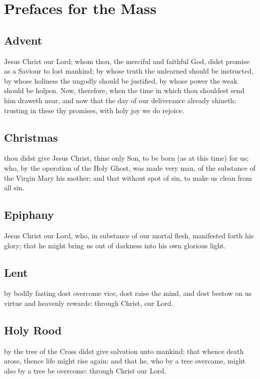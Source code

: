 \fancyhead[RE,LO]{}
\section{Prefaces for the Mass}\label{prefaces}

\begin{multicols}{2}
\subsection{Advent}%
 Jesus Christ our Lord; whom thou, the merciful and faithful God, didst promise as a Saviour to lost mankind; by whose truth the unlearned should be instructed, by whose holiness the ungodly should be justified, by whose power the weak should be holpen. Now, therefore, when the time in which thou shouldest send him draweth near, and now that the day of our deliverance already shineth; trusting in these thy promises, with holy joy we do rejoice.

\subsection{Christmas}%
\noindent
{} thou didst give Jesus Christ, thine only Son, to be born (as at this time) for us; who, by the operation of the Holy Ghost, was made very man, of the substance of the Virgin Mary his mother; and that without spot of sin, to make us clean from all sin.

\subsection{Epiphany}%
\noindent
{} Jesus Christ our Lord, who, in substance of our mortal flesh, manifested forth his glory; that he might bring us out of darkness into his own glorious light.

\subsection{Lent}%
\noindent
{} by bodily fasting dost overcome vice, dost raise the mind, and dost bestow on us virtue and heavenly rewards: through Christ, our Lord.

\subsection{Holy Rood}%
\noindent
{} by the tree of the Cross didst give salvation unto mankind: that whence death arose, thence life might rise again: and that he, who by a tree overcame, might also by a tree be overcome: through Christ our Lord.


\end{multicols}
